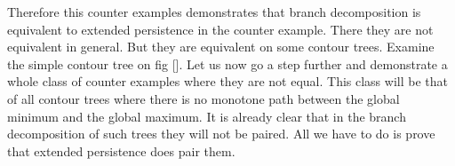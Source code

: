 Therefore this counter examples demonstrates that branch decomposition is equivalent to extended persistence in the counter example. There they are not equivalent in general. But they are equivalent on some contour trees. Examine the simple contour tree on fig []. Let us now go a step further and demonstrate a whole class of counter examples where they are not equal. This class will be that of all contour trees where there is no monotone path between the global minimum and the global maximum. It is already clear that in the branch decomposition of such trees they will not be paired. All we have to do is prove that extended persistence does pair them.




















